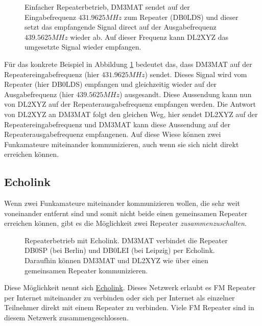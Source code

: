 \begin{figure}[!ht]
 \centering
 
 
 \caption{Einfacher Repeaterbetrieb, DM3MAT sendet auf der Eingabefrequenz $431.9625 MHz$ zum Repeater (DB0LDS) und dieser setzt das empfangende Signal direct auf der Ausgabefrequenz $439.5625 MHz$ wieder ab. Auf dieser Frequenz kann DL2XYZ das umgesetzte Signal wieder empfangen.} \label{fig:basicrepeater}
\end{figure}

Für das konkrete Beispiel in Abbildung \ref{fig:basicrepeater} bedeutet das, dass DM3MAT auf der Repeatereingabefrequenz (hier $431.9625 MHz$) sendet. Dieses Signal wird vom Repeater (hier DB0LDS) empfangen und gleichzeitig wieder auf der Ausgabefrequenz (hier $439.5625 MHz$) ausgesandt. Diese Aussendung kann nun von DL2XYZ auf der Repeaterausgabefrequenz empfangen werden. Die Antwort von DL2XYZ an DM3MAT folgt den gleichen Weg, hier sendet DL2XYZ auf der Repeatereingabefrequenz und DM3MAT kann diese Aussendung auf der Repeaterausgabefrequenz empfangenen. Auf diese Wiese können zwei Funkamateure miteinander kommunizieren, auch wenn sie sich nicht direkt erreichen können. 

\subsection{Echolink} \label{sec:echolink} 
Wenn zwei Funkamateure miteinander kommunizieren wollen, die sehr weit voneinander entfernt sind und somit nicht beide einen gemeinsamen Repeater erreichen können, gibt es die Möglichkeit zwei Repeater \emph{zusammenzuschalten}. 

\begin{figure}[!ht]
 \centering
 
 
 
 \caption{Repeaterbetrieb mit Echolink. DM3MAT verbindet die Repeater DB0SP (bei Berlin) und DB0LEI (bei Leipzig) per Echolink. Daraufhin können DM3MAT und DL2XYZ wie über einen gemeinsamen Repeater kommunizieren.} \label{fig:echolink}
\end{figure}

Diese Möglichkeit nennt sich \href{http://www.echolink.org/}{Echolink}. Dieses Netzwerk erlaubt es FM Repeater per Internet miteinander zu verbinden oder sich per Internet als einzelner Teilnehmer direkt mit einem Repeater zu verbinden. Viele FM Repeater sind in diesem Netzwerk zusammengeschlossen. 

